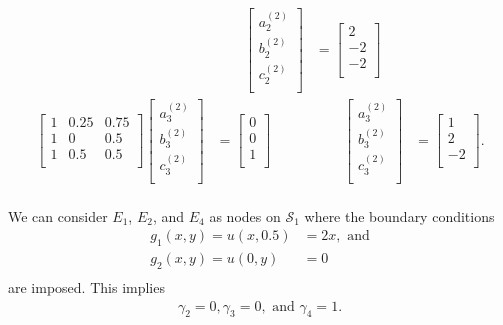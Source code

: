 \documentclass[12pt]{article}
\newcommand{\aonetwomatrix}{
  \begin{bmatrix}
    1 & 0.25 & 0.75 \\
    1 & 0    & 0.5  \\
    1 & 0.5  & 0.5  \\
  \end{bmatrix}
}
\newcommand{\bonematrix}[2]{
  \begin{bmatrix}
    a_{#1}^{(#2)} \\
    b_{#1}^{(#2)} \\
    c_{#1}^{(#2)} \\
  \end{bmatrix}
}
\newcommand{\setupatwomatrices}[2]{
\aonetwomatrix \bonematrix{#1}{#2}
}
\begin{document}
\begin{equation}
\begin{aligned}
    &\qquad\bonematrix{2}{2} &= \begin{bmatrix}2\\-2\\-2\\\end{bmatrix}\\
    \setupatwomatrices{3}{2}&
    = \begin{bmatrix} 0\\0\\1\\\end{bmatrix}
    &\qquad\bonematrix{3}{2} &= \begin{bmatrix}1\\2\\-2\\\end{bmatrix}.\\
  \end{aligned}
\end{equation}

We can consider $E_1$, $E_2$, and $E_4$ as nodes on $\mathcal{S}_1$
where the boundary conditions
\begin{equation*}
  \begin{aligned}
    g_1(x,y) = u(x,0.5) &= 2x, \text{ and}\\
    g_2(x,y) = u(0,y) &= 0 \\
  \end{aligned}
\end{equation*}
are imposed. This implies
\begin{equation}
  \label{eq:1_gamma_2_3_4}
  \begin{aligned}
    \gamma_2 = 0, \gamma_3 = 0, \text{ and } \gamma_4 = 1.
  \end{aligned}
\end{equation}
\end{document}
